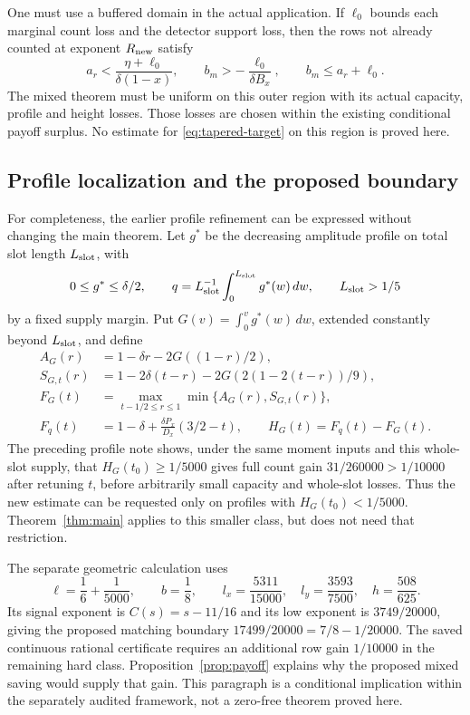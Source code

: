 \documentclass[11pt]{article}
\theoremstyle{definition}
\theoremstyle{remark}
\numberwithin{equation}{section}
\begin{document}
One must use a buffered domain in the actual application. If $\ell_0$
bounds each marginal count loss and the detector support loss, then
the rows not already counted at exponent $R_{\rm new}$ satisfy
\begin{equation}\label{eq:buffered-wedge}
a_r<\frac{\eta+\ell_0}{\delta(1-x)},\qquad
b_m>-\frac{\ell_0}{\delta B_x},\qquad b_m\le a_r+\ell_0.
\end{equation}
The mixed theorem must be uniform on this outer region with its actual
capacity, profile and height losses. Those losses are chosen within
the existing conditional payoff surplus. No estimate for
\eqref{eq:tapered-target} on this region is proved here.

\subsection{Profile localization and the proposed boundary}

For completeness, the earlier profile refinement can be expressed
without changing the main theorem. Let $g^*$ be the decreasing
amplitude profile on total slot length $L_{\rm slot}$, with
\[
0\le g^*\le\delta/2,\qquad
q=L_{\rm slot}^{-1}\int_0^{L_{\rm slot}}g^*(w)\,dw,
\qquad L_{\rm slot}>1/5
\]
by a fixed supply margin. Put $G(v)=\int_0^v g^*(w)\,dw$, extended
constantly beyond $L_{\rm slot}$, and define
\begin{align*}
A_G(r)&=1-\delta r-2G((1-r)/2),\\
S_{G,t}(r)&=1-2\delta(t-r)-2G(2(1-2(t-r))/9),\\
F_G(t)&=\max_{t-1/2\le r\le1}\min\{A_G(r),S_{G,t}(r)\},\\
F_q(t)&=1-\delta+\frac{\delta P_x}{D_x}(3/2-t),\qquad
H_G(t)=F_q(t)-F_G(t).
\end{align*}
The preceding profile note \cite{records} shows, under the same
moment inputs and this whole-slot supply, that
$H_G(t_0)\ge1/5000$ gives full count gain
$31/260000>1/10000$ after retuning $t$, before arbitrarily small
capacity and whole-slot losses. Thus the new estimate can
be requested only on profiles with $H_G(t_0)<1/5000$.
Theorem~\ref{thm:main} applies to this smaller class, but does not
need that restriction.

The separate geometric calculation uses
\[
\ell=\frac16+\frac1{5000},\qquad b=\frac18,\qquad
l_x=\frac{5311}{15000},\quad l_y=\frac{3593}{7500},
\quad h=\frac{508}{625}.
\]
Its signal exponent is $C(s)=s-11/16$ and its low exponent is
$3749/20000$, giving the proposed matching boundary
$17499/20000=7/8-1/20000$. The saved continuous rational certificate
requires an additional row gain $1/10000$ in the remaining hard class.
Proposition~\ref{prop:payoff} explains why the proposed mixed saving
would supply that gain. This paragraph is a conditional implication
within the separately audited framework, not a zero-free theorem
proved here.
\end{document}
